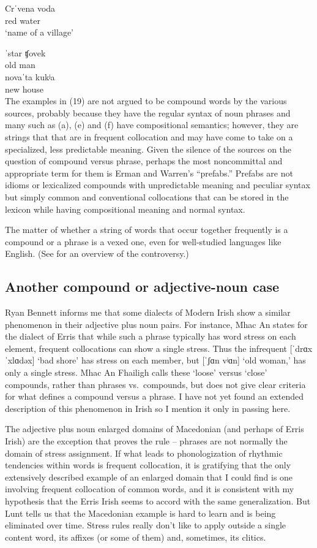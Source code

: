 \documentclass[output=paper,
modfonts
]{LSP/langsci}
\begin{document}
	\ex Crˈvena voda\\
	red water\\
	\glt ‘name of a village’

	\ex \gll ˈstar  ʧovek\\ 
	old man\\
	
	\ex \gll novaˈta kukʲa\\
	new house\\
	\z
\z
The examples in (19) are not argued to be compound words by the various sources, probably because they have the regular syntax of noun phrases and many such as (a), (e) and (f) have compositional semantics; however, they are strings that that are in frequent collocation and may have come to take on a specialized, less predictable meaning. Given the silence of the sources on the question of compound versus phrase, perhaps the most noncommittal and appropriate term for them is Erman and Warren’s \citeyearpar{erman2000} “prefabs.” Prefabs are not idioms or lexicalized compounds with unpredictable meaning and peculiar syntax but simply common and conventional collocations that can be stored in the lexicon while having compositional meaning and normal syntax. 

The matter of whether a string of words that occur together frequently is a compound or a phrase is a vexed one, even for well-studied languages like English. (See \citealt{plag2008} for an overview of the controversy.) 

\subsection{Another compound or adjective-noun case}

Ryan Bennett informs me that some dialects of Modern Irish show a similar phenomenon in their adjective plus noun pairs. For instance, Mhac An \citet{fhailigh1968} states for the dialect of Erris that while such a phrase typically has word stress on each element, frequent collocations can show a single stress. Thus the infrequent [ˈdrɑx ˈxlɑdəx] `bad shore' has stress on each member, but [ˈʃɑn vʲɑn] `old woman,' has only a single stress. Mhac An Fhailigh calls these ‘loose’ versus ‘close’ compounds, rather than phrases vs.\ compounds, but does not give clear criteria for what defines a compound versus a phrase. I have not yet found an extended description of this phenomenon in Irish so I mention it  only in passing here. 

The adjective plus noun enlarged domains of Macedonian (and perhaps of Erris Irish) are the exception that proves the rule -- phrases are not normally the domain of stress assignment. If what leads to phonologization of rhythmic tendencies within words is frequent collocation, it is gratifying that the only extensively described example of an enlarged domain that I could find is one involving frequent collocation of common words, and it is consistent with my hypothesis that the Erris Irish seems to accord with the same generalization. But Lunt tells us that the Macedonian example is hard to learn and is being eliminated over time. Stress rules really don’t like to apply outside a single content word, its affixes (or some of them) and, sometimes, its clitics. 
\end{document}

